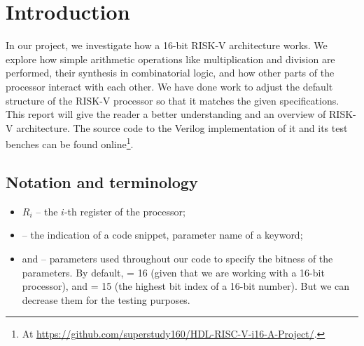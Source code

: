\section{Introduction}
In our project, we investigate how a 16-bit RISK-V architecture works.
We explore how simple arithmetic operations like multiplication and division are performed, their synthesis in combinatorial logic, and how other parts of the processor interact with each other.
We have done work to adjust the default structure of the RISK-V processor so that it matches the given specifications.
This report will give the reader a better understanding and an overview of RISK-V architecture.
The source code to the Verilog implementation of it and its test benches can be found online\footnote{At \url{https://github.com/superstudy160/HDL-RISC-V-i16-A-Project/}.}.

\subsection{Notation and terminology}

\begin{itemize}
    \setlength\itemsep{3pt}
    \item $R_i$ -- the $i$-th register of the processor;
    \item {} -- the indication of a code snippet, parameter name of a keyword;
    \item {} and  -- parameters used throughout our code to specify the bitness of the parameters. By default,  = 16 (given that we are working with a 16-bit processor), and  = 15 (the highest bit index of a 16-bit number). But we can decrease them for the testing purposes.
\end{itemize}